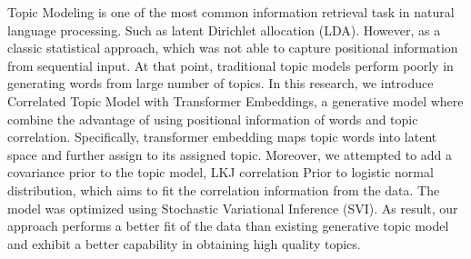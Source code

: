 \documentclass[master,interim,11pt]{iscs-thesis}
\date{\today}
\begin{document}
\begin{eabstract}
Topic Modeling is one of the most common information retrieval task in
natural language processing. Such as latent Dirichlet allocation (LDA).
However, as a classic statistical approach, which was not able to
capture positional information from sequential input. At that point,
traditional topic models perform poorly in generating words from large
number of topics. In this research, we introduce Correlated Topic Model
with Transformer Embeddings, a generative model where combine the
advantage of using positional information of words and topic
correlation. Specifically, transformer embedding maps topic words
into latent space and further assign to its assigned topic. Moreover, we
attempted to add a covariance prior to the topic model, LKJ correlation
Prior to logistic normal distribution, which aims to fit the correlation
information from the data. The model was optimized using Stochastic
Variational Inference (SVI). As result, our approach performs a better
fit of the data than existing generative topic model and exhibit a
better capability in obtaining high quality topics.
\end{eabstract}
\maketitle
\end{document}
